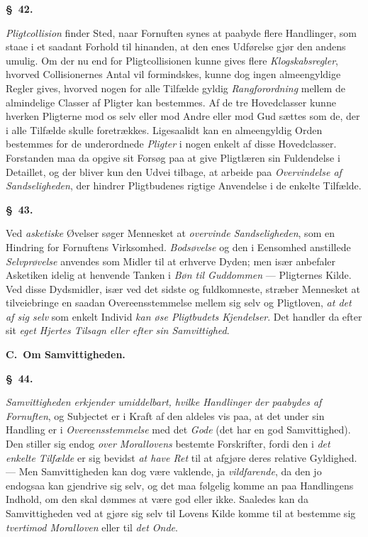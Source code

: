 \documentclass[12pt]{article}
\newcommand{\opage}[1]{\marginnote{\footnotesize\textit{[#1]}}}
\newcommand{\slaw}[1]{\par\medskip\begin{center}\textbf{\S~#1.}\end{center}\nopagebreak}
\begin{document}
\slaw{42}
\emph{Pligtcollision} finder Sted, naar Fornuften synes at paabyde flere Handlinger, som staae i et saadant Forhold til hinanden, at den enes Udførelse gjør den andens umulig. Om der nu end for Pligtcollisionen kunne gives flere \emph{Klogskabsregler}, hvorved Collisionernes Antal vil formindskes, kunne dog ingen almeengyldige Regler gives, hvorved nogen for alle Tilfælde gyldig \emph{Rangforordning} mellem de almindelige Classer af Pligter kan bestemmes. Af de tre Hovedclasser kunne hverken Pligterne mod os selv eller mod Andre eller mod Gud sættes som de, der i alle Tilfælde skulle foretrækkes. Ligesaalidt kan en almeengyldig Orden bestemmes for de underordnede \emph{Pligter} i nogen enkelt af disse Hovedclasser. Forstanden maa da opgive sit Forsøg paa at give Pligtlæren sin Fuldendelse i Detaillet, og der bliver kun den Udvei tilbage, at arbeide paa \emph{Overvindelse af Sandseligheden}, der hindrer Pligtbudenes rigtige Anvendelse i de enkelte Tilfælde.

\slaw{43}
Ved \emph{asketiske} Øvelser søger Mennesket at \emph{overvinde Sandseligheden}, som en Hindring for Fornuftens Virksomhed. \emph{Bodsøvelse} og den i Eensomhed anstillede \emph{Selvprøvelse} anvendes som Midler til at erhverve Dyden; men især anbefaler Asketiken idelig at henvende Tanken i \emph{Bøn til Guddommen} --- Pligternes Kilde. Ved disse Dydsmidler, især ved det sidste og fuldkomneste, stræber Mennesket at tilveiebringe \opage{161}en saadan Overeensstemmelse mellem sig selv og Pligtloven, \emph{at det af sig selv} som enkelt Individ \emph{kan øse Pligtbudets Kjendelser}. Det handler da efter sit \emph{eget Hjertes Tilsagn eller efter sin Samvittighed}.

\begin{center}\textbf{C.\ Om Samvittigheden.}\end{center}

\slaw{44}
\emph{Samvittigheden erkjender umiddelbart, hvilke Handlinger der paabydes af Fornuften}, og Subjectet er i Kraft af den aldeles vis paa, at det under sin Handling er i \emph{Overeensstemmelse} med det \emph{Gode} (det har en god Samvittighed). Den stiller sig endog \emph{over Morallovens} bestemte Forskrifter, fordi den i \emph{det enkelte Tilfælde} er sig bevidst \emph{at have Ret} til at afgjøre deres relative Gyldighed. --- Men Samvittigheden kan dog være vaklende, ja \emph{vildfarende}, da den jo endogsaa kan gjendrive sig selv, og det maa følgelig komme an paa Handlingens Indhold, om den skal dømmes at være god eller ikke. Saaledes kan da Samvittigheden ved at gjøre sig selv til Lovens Kilde komme til at bestemme sig \emph{tvertimod Moralloven} eller til \emph{det Onde}.
\end{document}
